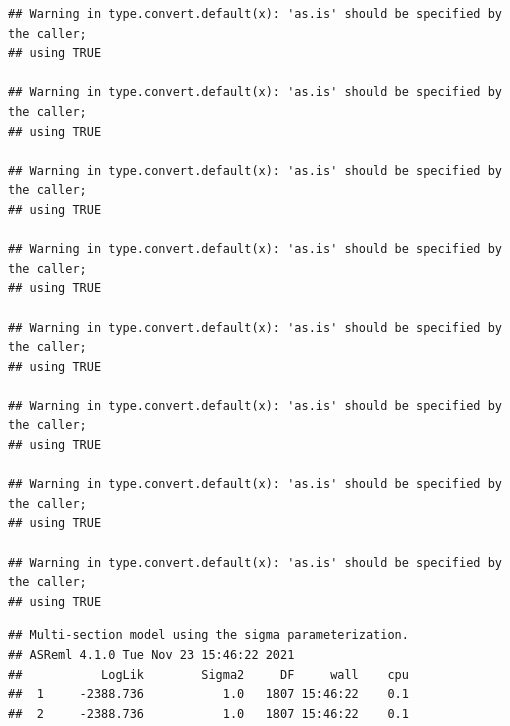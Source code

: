 \documentclass[
  12pt,
]{book}
\newenvironment{Shaded}{\begin{snugshade}}{\end{snugshade}}
\newcommand{\KeywordTok}[1]{\textcolor[rgb]{0.13,0.29,0.53}{\textbf{#1}}}
\newcommand{\NormalTok}[1]{#1}
\newcommand{\OperatorTok}[1]{\textcolor[rgb]{0.81,0.36,0.00}{\textbf{#1}}}
\begin{document}
\begin{verbatim}
## Warning in type.convert.default(x): 'as.is' should be specified by the caller;
## using TRUE

## Warning in type.convert.default(x): 'as.is' should be specified by the caller;
## using TRUE

## Warning in type.convert.default(x): 'as.is' should be specified by the caller;
## using TRUE

## Warning in type.convert.default(x): 'as.is' should be specified by the caller;
## using TRUE

## Warning in type.convert.default(x): 'as.is' should be specified by the caller;
## using TRUE

## Warning in type.convert.default(x): 'as.is' should be specified by the caller;
## using TRUE

## Warning in type.convert.default(x): 'as.is' should be specified by the caller;
## using TRUE

## Warning in type.convert.default(x): 'as.is' should be specified by the caller;
## using TRUE
\end{verbatim}

\begin{verbatim}
## Multi-section model using the sigma parameterization.
## ASReml 4.1.0 Tue Nov 23 15:46:22 2021
##           LogLik        Sigma2     DF     wall    cpu
##  1     -2388.736           1.0   1807 15:46:22    0.1
##  2     -2388.736           1.0   1807 15:46:22    0.1
\end{verbatim}

\begin{Shaded}
\end{Shaded}
\end{document}
